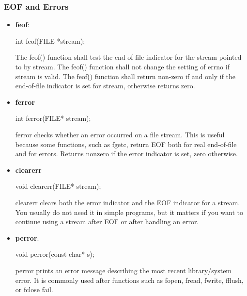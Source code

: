 \documentclass{report}
\begin{document}
    \subsubsection{EOF and Errors}
    \begin{itemize}
        \item \textbf{feof}: 
            \bigbreak \noindent 
            \begin{cppcode}
               int feof(FILE *stream);
            \end{cppcode}
            \bigbreak \noindent 
            The feof() function shall test the end-of-file indicator for the stream pointed to by stream.
            \bigbreak \noindent 
            The feof() function shall not change the setting of errno if stream is valid.
            \bigbreak \noindent 
            The feof() function shall return non-zero if and only if the end-of-file indicator is set for stream, otherwise returns zero.
        \item \textbf{ferror}
            \bigbreak \noindent 
            \begin{cppcode}
            int ferror(FILE* stream);
            \end{cppcode}
            \bigbreak \noindent 
            ferror checks whether an error occurred on a file stream.
            \bigbreak \noindent 
            This is useful because some functions, such as fgetc, return EOF both for real end-of-file and for errors.
            \bigbreak \noindent 
            Returns nonzero if the error indicator is set, zero otherwise.
        \item \textbf{clearerr}
            \bigbreak \noindent 
            \begin{cppcode}
                void clearerr(FILE* stream);
            \end{cppcode}
            \bigbreak \noindent 
            clearerr clears both the error indicator and the EOF indicator for a stream.
            \bigbreak \noindent 
            You usually do not need it in simple programs, but it matters if you want to continue using a stream after EOF or after handling an error.
        \item \textbf{perror}: 
            \bigbreak \noindent 
            \begin{cppcode}
            void perror(const char* s);
            \end{cppcode}
            \bigbreak \noindent 
            perror prints an error message describing the most recent library/system error.
            \bigbreak \noindent 
            It is commonly used after functions such as fopen, fread, fwrite, fflush, or fclose fail.

    \end{itemize}
\end{document}
